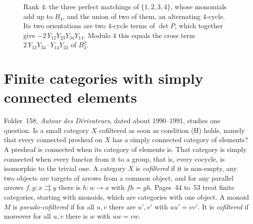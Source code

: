 \documentclass[11pt,a4paper]{amsart}
\theoremstyle{definition}
\theoremstyle{remark}
\begin{document}
\begin{figure}[ht]
\centering
{}
\caption{Rank $4$: the three perfect matchings of $\{1,2,3,4\}$, whose monomials add up to $B_4$, and the union of two of them, an alternating $4$-cycle. Its two orientations are two $4$-cycle terms of $\det P$, which together give $-2\,Y_{12}Y_{23}Y_{34}Y_{14}$. Modulo $4$ this equals the cross term $2\,Y_{12}Y_{34}\cdot Y_{14}Y_{23}$ of $B_4^2$.}\label{fig:match}
\end{figure}

\section{Finite categories with simply connected elements}\label{sec:cof}

Folder~158, \emph{Autour des Dérivateurs}, dated about 1990--1991, studies one question. Is a small category $X$ cofiltered as soon as condition (H) holds, namely that every connected presheaf on $X$ has a simply connected category of elements? A presheaf is connected when its category of elements is. That category is simply connected when every functor from it to a group, that is, every cocycle, is isomorphic to the trivial one. A category $X$ is \emph{cofiltered} if it is non-empty, any two objects are targets of arrows from a common object, and for any parallel arrows $f, g\colon x \rightrightarrows y$ there is $h\colon w \to x$ with $fh = gh$. Pages~44 to~53 treat finite categories, starting with monoids, which are categories with one object. A monoid $M$ is \emph{pseudo-cofiltered} if for all $u, v$ there are $u', v'$ with $uu' = vv'$. It is \emph{cofiltered} if moreover for all $u, v$ there is $w$ with $uw = vw$.
\end{document}
